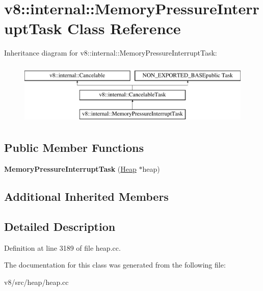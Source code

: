 \hypertarget{classv8_1_1internal_1_1MemoryPressureInterruptTask}{}\section{v8\+:\+:internal\+:\+:Memory\+Pressure\+Interrupt\+Task Class Reference}
\label{classv8_1_1internal_1_1MemoryPressureInterruptTask}
Inheritance diagram for v8\+:\+:internal\+:\+:Memory\+Pressure\+Interrupt\+Task\+:\begin{figure}[H]
\begin{center}
\leavevmode
\includegraphics[height=3.000000cm]{classv8_1_1internal_1_1MemoryPressureInterruptTask}
\end{center}
\end{figure}
\subsection*{Public Member Functions}
\begin{DoxyCompactItemize}
\item 
\mbox{\label{classv8_1_1internal_1_1MemoryPressureInterruptTask_aaf283c13796191e6e4a1d2cb13b7cf42}} 
{\bfseries Memory\+Pressure\+Interrupt\+Task} (\mbox{\hyperlink{classv8_1_1internal_1_1Heap}{Heap}} $\ast$heap)
\end{DoxyCompactItemize}
\subsection*{Additional Inherited Members}


\subsection{Detailed Description}


Definition at line 3189 of file heap.\+cc.



The documentation for this class was generated from the following file\+:\begin{DoxyCompactItemize}
\item 
v8/src/heap/heap.\+cc\end{DoxyCompactItemize}

